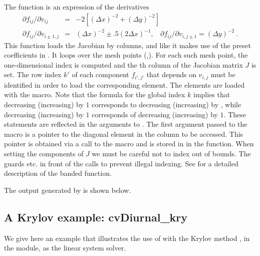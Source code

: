 The  function is an expression of the derivatives
\vspace*{-.08in}
\begin{eqnarray*}
\partial f_{ij} / \partial v_{ij} &=&
         -2 [(\Delta x)^{-2} + (\Delta y)^{-2}] \\
\partial f_{ij} / \partial v_{i \pm 1,j} &=& (\Delta x)^{-2} 
                  \pm .5 (2 \Delta x)^{-1}, ~~~~
\partial f_{ij} / \partial v_{i,j \pm 1}  =  (\Delta y)^{-2} ~. 
\end{eqnarray*}
This function loads the Jacobian by columns, and like  it
makes use of the preset coefficients in .
It loops over the mesh points (,). For each such mesh
point, the one-dimensional index  is computed
and the th column of the Jacobian matrix $J$ is set. 
The row index $k'$ of each component $f_{i',j'}$ that depends on
$v_{i,j}$ must be identified in order to load the corresponding element.
The elements are loaded with the  macro.
Note that the formula for the global index $k$ implies that decreasing 
(increasing)  by $1$ corresponds to decreasing (increasing) 
 by , while decreasing (increasing)  by $1$ 
corresponds of decreasing (increasing)  by $1$. 
These statements are reflected in the arguments to . 
The first argument passed to the  macro is a pointer to
the diagonal element in the column to be accessed. This pointer is obtained
via a call to the  macro and is stored in  in
the  function. When setting the components of $J$ we must be
careful not to index out of bounds. The guards  etc.
in front of the calls to  prevent illegal indexing.
See  for a detailed description of the banded 
function.

The output generated by  is shown below.



\subsection{A Krylov example: cvDiurnal\_kry}\label{ss:cvDiurnal}

We give here an example that illustrates the use of {\cvode} with the Krylov
method {\spgmr}, in the {\cvspgmr} module, as the linear system solver.  

